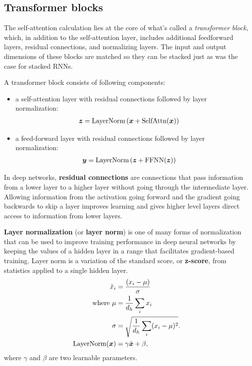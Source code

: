\documentclass[11pt]{article}
\begin{document}
\subsection{Transformer blocks}
The self-attention calculation lies at the core of what’s called a \emph{transformer block}, which, in addition to the self-attention layer, includes additional feedforward layers,
residual connections, and normalizing layers. The input and output dimensions of these blocks are matched so they can be stacked just as was the case for stacked
RNNs. 

A transformer block consists of following components:
\begin{itemize}
\item a self-attention layer with residual connections followed by layer normalization:
\begin{align*}
\boldsymbol{z} &= \text{LayerNorm}\left(\boldsymbol{x} + \text{SelfAttn}(\boldsymbol{x})\right)
\end{align*}

\item a feed-forward layer with residual connections followed by layer normalization:
\begin{align*}
\boldsymbol{y} &= \text{LayerNorm}\left(\boldsymbol{z} + \text{FFNN}(\boldsymbol{z})\right)
\end{align*}
\end{itemize}

In deep networks, \textbf{residual connections} \citep{he2016deep} are connections that pass information from a lower layer to a higher layer without going through the intermediate layer. Allowing information from the activation going forward and the gradient going backwards to skip a layer improves learning and gives higher level layers direct access to information from lower layers.


\textbf{Layer normalization} (or \textbf{layer norm}) is one of many forms of normalization that can be used to improve training performance in deep neural networks by keeping the values of a hidden layer in a range that facilitates gradient-based training. Layer norm is a variation of the standard score, or \textbf{z-score}, from statistics applied to a single hidden layer. 
\begin{align*}
\hat{x}_{i} &= \frac{(x_{i} - \mu)}{\sigma} \\
\text{where } \mu &= \frac{1}{d_{h}}\sum_{i}x_{i} \\
 \sigma &= \sqrt{\frac{1}{d_{h}}\sum_{i}(x_{i} - \mu)^{2}}. \\
  \text{LayerNorm}(\boldsymbol{x}) &= \gamma \hat{\boldsymbol{x}} + \beta,
\end{align*} where $\gamma$ and $\beta$ are two learnable parameters.
\end{document}
